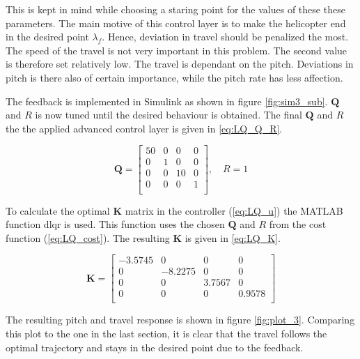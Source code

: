 \documentclass[a4paper, 12pt]{article}\usepackage[utf8]{inputenc}
\begin{document}
This is kept in mind while choosing a staring point for the values of these these parameters. The main motive of this control layer is to make the helicopter end in the desired point $\lambda_f$. Hence, deviation in travel should be penalized the most. The speed of the travel is not very important in this problem. The second value is therefore set relatively low. The travel is dependant on the pitch. Deviations in pitch is there also of certain importance, while the pitch rate has less affection.  

The feedback is implemented in Simulink as shown in figure \ref{fig:sim3_sub}. $\boldsymbol{Q}$ and $R$ is now tuned until the desired behaviour is obtained. The final $\boldsymbol{Q}$ and $R$ the the applied advanced control layer is given in \ref{eq:LQ_Q_R}.


\begin{equation} \label{eq:LQ_Q_R}
    \boldsymbol{Q}=
    \begin{bmatrix}
    50  &   0   &   0   &   0   \\
    0   &   1   &   0   &   0   \\
    0   &   0   &   10  &   0   \\
    0   &   0   &   0   &   1   \\
    \end{bmatrix}
    , \quad R=1
\end{equation}

To calculate the optimal $\boldsymbol{K}$ matrix in the controller (\ref{eq:LQ_u}) the MATLAB function dlqr is used. This function uses the chosen $\boldsymbol{Q}$ and $R$ from the cost function (\ref{eq:LQ_cost}). The resulting $\boldsymbol{K}$ is given in \ref{eq:LQ_K}.

\begin{equation} \label{eq:LQ_K}
    \boldsymbol{K}=
    \begin{bmatrix}
    -3.5745 &       0       &       0       &       0   \\
    0       &       -8.2275 &       0       &       0   \\
    0       &       0       &       3.7567  &       0   \\
    0       &       0       &       0       &       0.9578\\
    \end{bmatrix}
\end{equation}


The resulting pitch and travel response is shown in figure \ref{fig:plot_3}. Comparing this plot to the one in the last section, it is clear that the travel follows the optimal trajectory and stays in the desired point due to the feedback.
\end{document}

